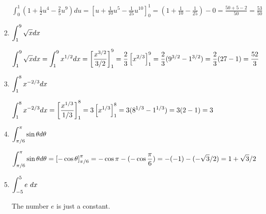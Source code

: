 \begin{enumerate}[1.]
\begin{Solution}
  $\int_0^1 (1 + \frac{1}{2} u^4 - \frac{2}{5} u^9) du = 
    [u + \frac{1}{10} u^5 - \frac{1}{25} u^10]_0^1 = 
    (1 + \frac{1}{10} - \frac{1}{25}) - 0 = \frac{50 + 5 - 2}{50} = \frac{53}{50}$
\end{Solution}

\item \begin{Question}
  $\displaystyle \int_1^9 \sqrt{x} dx$
\end{Question}

\begin{Solution}
  $\displaystyle \int_1^9 \sqrt{x} dx = \int_1^9 x^{1 / 2} dx = 
    \left[ \frac{x^{3 / 2}}{3 / 2} \right]_1^9 =
    \frac{2}{3} \left[ x^{2 / 3} \right]_1^9 =
    \frac{2}{3} (9^{3 / 2} - 1^{3 / 2}) = 
    \frac{2}{3} (27 - 1) = \frac{52}{3}$
\end{Solution}

\item \begin{Question}
    
  $\displaystyle \int_1^8 x^{-2 / 3} dx$
\end{Question}

\begin{Solution}
    
  $\displaystyle \int_1^8 x^{-2 / 3} dx = 
    \left[ \frac{x^{1 / 3}}{1 / 3} \right]_1^8 = 
    3 \left[ x^{1 / 3} \right]_1^8 = 
    3(8^{1 / 3} - 1^{1 / 3}) = 3(2 - 1) = 3$
    
\end{Solution}

\item \begin{Question}
    
  $\displaystyle \int_{\pi / 6}^{\pi} \sin \theta d \theta$
\end{Question}

\begin{Solution}
  $\displaystyle \int_{\pi / 6}^{\pi} \sin \theta d \theta =
    \left[ - \cos \theta \right]_{\pi / 6}^{\pi} =
    - \cos \pi - ( - \cos \frac{\pi}{6} ) = 
    -(-1) - (- \sqrt{3} / 2) = 1 + \sqrt{3} / 2$
\end{Solution}

\item \begin{Question}
    
  $\displaystyle \int_{-5}^5 e~ dx$
\end{Question}

\begin{Solution}
  The number $e$ is just a constant. 


\end{Solution}
\end{enumerate}
